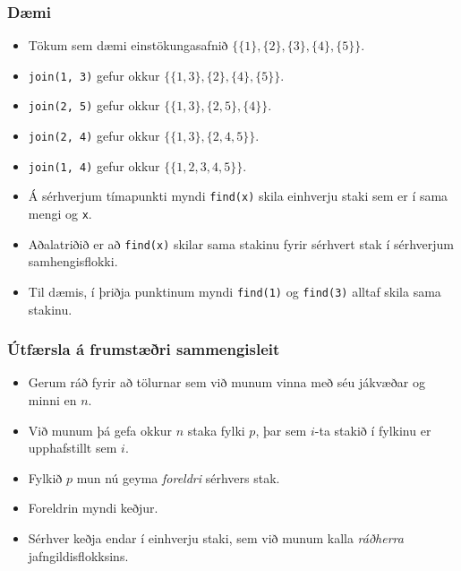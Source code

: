 \documentclass{beamer}
\begin{document}
\begin{frame}
\frametitle{Dæmi}
\begin{itemize}

	\item<1-> Tökum sem dæmi einstökungasafnið
		$\{\{1\}, \{2\}, \{3\}, \{4\}, \{5\}\}$. 
	\item<2-> \texttt{join(1, 3)} gefur okkur
		$\{\{1, 3\}, \{2\}, \{4\}, \{5\}\}$. 
	\item<3-> \texttt{join(2, 5)} gefur okkur
		$\{\{1, 3\}, \{2, 5\}, \{4\}\}$. 
	\item<4-> \texttt{join(2, 4)} gefur okkur
		$\{\{1, 3\}, \{2, 4, 5\}\}$. 
	\item<5-> \texttt{join(1, 4)} gefur okkur
		$\{\{1, 2, 3, 4, 5\}\}$. 
	\item<6-> Á sérhverjum tímapunkti myndi \texttt{find(x)} skila einhverju staki sem er í sama mengi og \texttt{x}.
	\item<7-> Aðalatriðið er að \texttt{find(x)} skilar sama stakinu fyrir sérhvert stak í sérhverjum samhengisflokki.
	\item<8-> Til dæmis, í þriðja punktinum myndi \texttt{find(1)} og \texttt{find(3)} alltaf skila sama stakinu.
\end{itemize}
\end{frame}

\begin{frame}
\frametitle{Útfærsla á frumstæðri sammengisleit}
\begin{itemize}
	\item<1-> Gerum ráð fyrir að tölurnar sem við munum vinna með séu jákvæðar og minni en $n$.
	\item<2-> Við munum þá gefa okkur $n$ staka fylki $p$, þar sem $i$-ta stakið í fylkinu er upphafstillt sem $i$.
	\item<3-> Fylkið $p$ mun nú geyma \emph{foreldri} sérhvers stak.
	\item<3-> Foreldrin myndi keðjur.
	\item<4-> Sérhver keðja endar í einhverju staki, sem við munum kalla \emph{ráðherra} jafngildisflokksins.
\end{itemize}
\end{frame}
\end{document}
